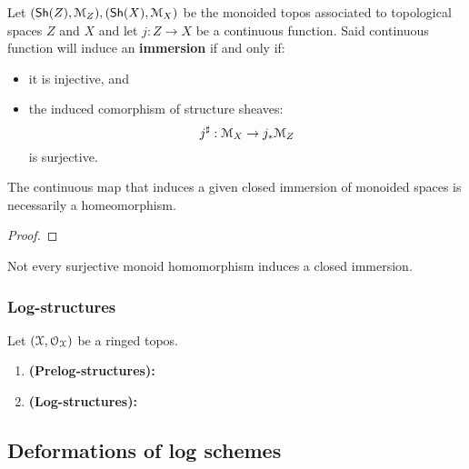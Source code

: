                 \begin{definition}[Immersions] \label{def: immersions_of_monoided_spaces}
                    Let $(\mathsf{Sh}(Z), \mathcal{M}_Z), (\mathsf{Sh}(X), \mathcal{M}_X)$ be the monoided topos associated to topological spaces $Z$ and $X$ and let $j: Z \to X$ be a continuous function. Said continuous function will induce an \textbf{immersion} if and only if:
                        \begin{itemize}
                            \item it is injective, and 
                            \item the induced comorphism of structure sheaves:
                                $$j^{\sharp}: \mathcal{M}_X \to j_*\mathcal{M}_Z$$
                            is surjective.
                        \end{itemize}
                \end{definition}
                \begin{proposition} \label{prop: closed_immersions_of_monoided_spaces_are_bijective}
                    The continuous map that induces a given closed immersion of monoided spaces is necessarily a homeomorphism.  
                \end{proposition}
                    \begin{proof}
                                    
                    \end{proof}
                \begin{corollary}
                    Not every surjective monoid homomorphism induces a closed immersion.
                \end{corollary}
                
            \subsubsection{Log-structures}
                \begin{definition} \label{def: log_structures}
                    Let $(\mathcal{X}, \mathcal{O}_{\mathcal{X}})$ be a ringed topos.
                    \begin{enumerate}
                        \item \textbf{(Prelog-structures):}
                        \item \textbf{(Log-structures):}
                    \end{enumerate}
                \end{definition}
        
        \subsection{Deformations of log schemes}